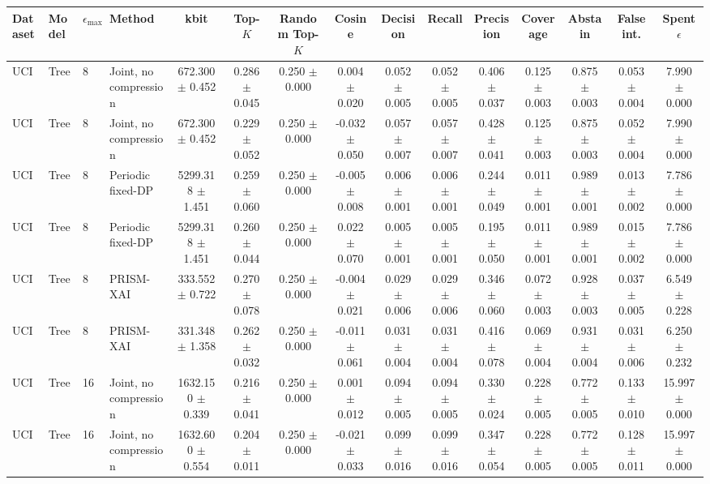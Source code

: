 \begin{tabular}{llllccccccccccc}
\toprule
Dataset & Model & $\epsilon_{\max}$ & Method & kbit & Top-$K$ & Random Top-$K$ & Cosine & Decision & Recall & Precision & Coverage & Abstain & False int. & Spent $\epsilon$ \\
\midrule
UCI & Tree & 8 & Joint, no compression & 672.300 $\pm$ 0.452 & 0.286 $\pm$ 0.045 & 0.250 $\pm$ 0.000 & 0.004 $\pm$ 0.020 & 0.052 $\pm$ 0.005 & 0.052 $\pm$ 0.005 & 0.406 $\pm$ 0.037 & 0.125 $\pm$ 0.003 & 0.875 $\pm$ 0.003 & 0.053 $\pm$ 0.004 & 7.990 $\pm$ 0.000 \\
UCI & Tree & 8 & Joint, no compression & 672.300 $\pm$ 0.452 & 0.229 $\pm$ 0.052 & 0.250 $\pm$ 0.000 & -0.032 $\pm$ 0.050 & 0.057 $\pm$ 0.007 & 0.057 $\pm$ 0.007 & 0.428 $\pm$ 0.041 & 0.125 $\pm$ 0.003 & 0.875 $\pm$ 0.003 & 0.052 $\pm$ 0.004 & 7.990 $\pm$ 0.000 \\
UCI & Tree & 8 & Periodic fixed-DP & 5299.318 $\pm$ 1.451 & 0.259 $\pm$ 0.060 & 0.250 $\pm$ 0.000 & -0.005 $\pm$ 0.008 & 0.006 $\pm$ 0.001 & 0.006 $\pm$ 0.001 & 0.244 $\pm$ 0.049 & 0.011 $\pm$ 0.001 & 0.989 $\pm$ 0.001 & 0.013 $\pm$ 0.002 & 7.786 $\pm$ 0.000 \\
UCI & Tree & 8 & Periodic fixed-DP & 5299.318 $\pm$ 1.451 & 0.260 $\pm$ 0.044 & 0.250 $\pm$ 0.000 & 0.022 $\pm$ 0.070 & 0.005 $\pm$ 0.001 & 0.005 $\pm$ 0.001 & 0.195 $\pm$ 0.050 & 0.011 $\pm$ 0.001 & 0.989 $\pm$ 0.001 & 0.015 $\pm$ 0.002 & 7.786 $\pm$ 0.000 \\
UCI & Tree & 8 & PRISM-XAI & 333.552 $\pm$ 0.722 & 0.270 $\pm$ 0.078 & 0.250 $\pm$ 0.000 & -0.004 $\pm$ 0.021 & 0.029 $\pm$ 0.006 & 0.029 $\pm$ 0.006 & 0.346 $\pm$ 0.060 & 0.072 $\pm$ 0.003 & 0.928 $\pm$ 0.003 & 0.037 $\pm$ 0.005 & 6.549 $\pm$ 0.228 \\
UCI & Tree & 8 & PRISM-XAI & 331.348 $\pm$ 1.358 & 0.262 $\pm$ 0.032 & 0.250 $\pm$ 0.000 & -0.011 $\pm$ 0.061 & 0.031 $\pm$ 0.004 & 0.031 $\pm$ 0.004 & 0.416 $\pm$ 0.078 & 0.069 $\pm$ 0.004 & 0.931 $\pm$ 0.004 & 0.031 $\pm$ 0.006 & 6.250 $\pm$ 0.232 \\
UCI & Tree & 16 & Joint, no compression & 1632.150 $\pm$ 0.339 & 0.216 $\pm$ 0.041 & 0.250 $\pm$ 0.000 & 0.001 $\pm$ 0.012 & 0.094 $\pm$ 0.005 & 0.094 $\pm$ 0.005 & 0.330 $\pm$ 0.024 & 0.228 $\pm$ 0.005 & 0.772 $\pm$ 0.005 & 0.133 $\pm$ 0.010 & 15.997 $\pm$ 0.000 \\
UCI & Tree & 16 & Joint, no compression & 1632.600 $\pm$ 0.554 & 0.204 $\pm$ 0.011 & 0.250 $\pm$ 0.000 & -0.021 $\pm$ 0.033 & 0.099 $\pm$ 0.016 & 0.099 $\pm$ 0.016 & 0.347 $\pm$ 0.054 & 0.228 $\pm$ 0.005 & 0.772 $\pm$ 0.005 & 0.128 $\pm$ 0.011 & 15.997 $\pm$ 0.000 \\

\end{tabular}
